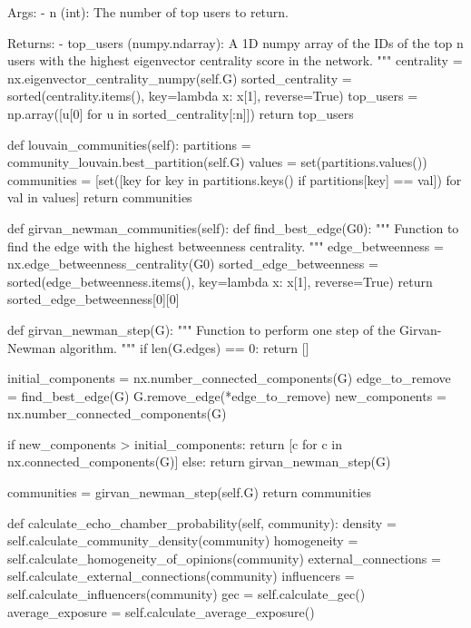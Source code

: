 \begin{codigo}[caption={Exemplo de classe Python para deteção de câmaras de eco}, label={codigo:echochamberdetector}, language=Python, breaklines=true]
        Args:
        - n (int): The number of top users to return.

        Returns:
        - top_users (numpy.ndarray): A 1D numpy array of the IDs of the top n users with the highest eigenvector
        centrality score in the network.
        """
        centrality = nx.eigenvector_centrality_numpy(self.G)
        sorted_centrality = sorted(centrality.items(), key=lambda x: x[1], reverse=True)
        top_users = np.array([u[0] for u in sorted_centrality[:n]])
        return top_users

    def louvain_communities(self):
        partitions = community_louvain.best_partition(self.G)
        values = set(partitions.values())
        communities = [set([key for key in partitions.keys() if partitions[key] == val]) for val in values]
        return communities

    def girvan_newman_communities(self):
        def find_best_edge(G0):
            """
            Function to find the edge with the highest betweenness centrality.
            """
            edge_betweenness = nx.edge_betweenness_centrality(G0)
            sorted_edge_betweenness = sorted(edge_betweenness.items(), key=lambda x: x[1], reverse=True)
            return sorted_edge_betweenness[0][0]

        def girvan_newman_step(G):
            """
            Function to perform one step of the Girvan-Newman algorithm.
            """
            if len(G.edges) == 0:
                return []

            initial_components = nx.number_connected_components(G)
            edge_to_remove = find_best_edge(G)
            G.remove_edge(*edge_to_remove)
            new_components = nx.number_connected_components(G)

            if new_components > initial_components:
                return [c for c in nx.connected_components(G)]
            else:
                return girvan_newman_step(G)

        communities = girvan_newman_step(self.G)
        return communities

    def calculate_echo_chamber_probability(self, community):
        density = self.calculate_community_density(community)
        homogeneity = self.calculate_homogeneity_of_opinions(community)
        external_connections = self.calculate_external_connections(community)
        influencers = self.calculate_influencers(community)
        gec = self.calculate_gec()
        average_exposure = self.calculate_average_exposure()


\end{codigo}
